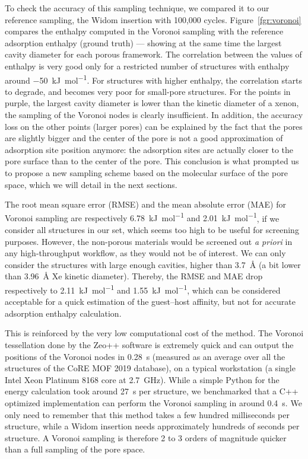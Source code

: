 \documentclass[main]{subfiles}
\begin{document}
To check the accuracy of this sampling technique, we compared it to our reference sampling, the Widom insertion with 100,000 cycles. Figure~\ref{fgr:voronoi} compares the enthalpy computed in the Voronoi sampling with the reference adsorption enthalpy (ground truth) --- showing at the same time the largest cavity diameter for each porous framework. The correlation between the values of enthalpy is very good only for a restricted number of structures with enthalpy around \SI{-50}{\kilo\joule\per\mole}. For structures with higher enthalpy, the correlation starts to degrade, and becomes very poor for small-pore structures. For the points in purple, the largest cavity diameter is lower than the kinetic diameter of a xenon, the sampling of the Voronoi nodes is clearly insufficient. In addition, the accuracy loss on the other points (larger pores) can be explained by the fact that the pores are slightly bigger and the center of the pore is not a good approximation of adsorption site position anymore: the adsorption sites are actually closer to the pore surface than to the center of the pore. This conclusion is what prompted us to propose a new sampling scheme based on the molecular surface of the pore space, which we will detail in the next sections.

The root mean square error (RMSE) {and the mean absolute error (MAE) for Voronoi sampling are respectively \SI{6.78}{\kilo\joule\per\mole} and \SI{2.01}{\kilo\joule\per\mole}}, if we consider all structures in our set, which seems too high to be useful for screening purposes. However, the non-porous materials would be screened out \emph{a priori} in any high-throughput workflow, as they would not be of interest. We can only consider the structures with large enough cavities, higher than \SI{3.7}{\angstrom} (a bit lower than \SI{3.96}{\angstrom} Xe kinetic diameter). Thereby, {the RMSE and MAE drop respectively to \SI{2.11}{\kilo\joule\per\mole} and \SI{1.55}{\kilo\joule\per\mole}}, which can be considered acceptable for a quick estimation of the guest--host affinity, but not for accurate adsorption enthalpy calculation.

This is reinforced by the very low computational cost of the method. The Voronoi tessellation done by the Zeo++ software is extremely quick and can output the positions of the Voronoi nodes in \SI{0.28}{\second} (measured as an average over all the structures of the CoRE MOF 2019 database), on a typical workstation (a single Intel Xeon Platinum 8168 core at 2.7~\si{\giga\hertz}). While a simple Python for the energy calculation took around \SI{27}{\second} per structure, we benchmarked that a C++ optimized implementation can perform the Voronoi sampling in around \SI{0.4}{\second}. We only need to remember that this method takes a few hundred milliseconds per structure, while a Widom insertion needs approximately hundreds of seconds per structure. A Voronoi sampling is therefore 2 to 3 orders of magnitude quicker than a full sampling of the pore space.
\end{document}
